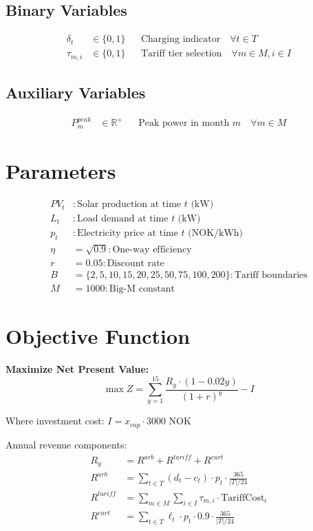 \documentclass{article}
\begin{document}
\subsection{Binary Variables}
\begin{align}
\delta_t &\in \{0,1\} && \text{Charging indicator} \quad \forall t \in T\\
\tau_{m,i} &\in \{0,1\} && \text{Tariff tier selection} \quad \forall m \in M, i \in I
\end{align}

\subsection{Auxiliary Variables}
\begin{align}
P^{peak}_m &\in \mathbb{R}^+ && \text{Peak power in month } m \quad \forall m \in M
\end{align}

\section{Parameters}
\begin{align}
PV_t &: \text{Solar production at time } t \text{ (kW)}\\
L_t &: \text{Load demand at time } t \text{ (kW)}\\
p_t &: \text{Electricity price at time } t \text{ (NOK/kWh)}\\
\eta &= \sqrt{0.9} : \text{One-way efficiency}\\
r &= 0.05 : \text{Discount rate}\\
B &= \{2, 5, 10, 15, 20, 25, 50, 75, 100, 200\} : \text{Tariff boundaries}\\
M &= 1000 : \text{Big-M constant}
\end{align}

\section{Objective Function}

\textbf{Maximize Net Present Value:}
\begin{equation}
\max Z = \sum_{y=1}^{15} \frac{R_y \cdot (1 - 0.02y)}{(1 + r)^y} - I
\end{equation}

Where investment cost: $I = x_{cap} \cdot 3000$ NOK

Annual revenue components:
\begin{align}
R_y &= R^{arb} + R^{tariff} + R^{curt}\\
R^{arb} &= \sum_{t \in T} (d_t - c_t) \cdot p_t \cdot \frac{365}{|T|/24}\\
R^{tariff} &= \sum_{m \in M} \sum_{i \in I} \tau_{m,i} \cdot \text{TariffCost}_i\\
R^{curt} &= \sum_{t \in T} \ell_t \cdot p_t \cdot 0.9 \cdot \frac{365}{|T|/24}
\end{align}
\end{document}
